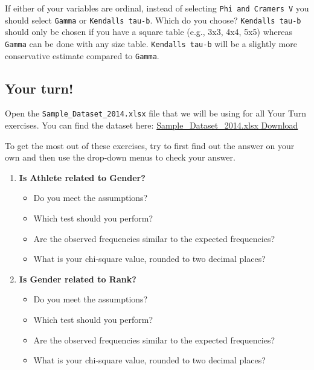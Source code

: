 \documentclass[
]{book}
\begin{document}
If either of your variables are ordinal, instead of selecting \texttt{Phi\ and\ Cramer\textquotesingle{}s\ V} you should select \texttt{Gamma} or \texttt{Kendall\textquotesingle{}s\ tau-b}. Which do you choose? \texttt{Kendall\textquotesingle{}s\ tau-b} should only be chosen if you have a square table (e.g., 3x3, 4x4, 5x5) whereas \texttt{Gamma} can be done with any size table. \texttt{Kendall\textquotesingle{}s\ tau-b} will be a slightly more conservative estimate compared to \texttt{Gamma}.

\hypertarget{your-turn-4}{%
\subsection{Your turn!}\label{your-turn-4}}

Open the \texttt{Sample\_Dataset\_2014.xlsx} file that we will be using for all Your Turn exercises. You can find the dataset here: \href{https://github.com/danawanzer/stats-with-jamovi/blob/master/data/Sample_Dataset_2014.xlsx}{Sample\_Dataset\_2014.xlsx Download}

To get the most out of these exercises, try to first find out the answer on your own and then use the drop-down menus to check your answer.

\begin{enumerate}
\def\labelenumi{\arabic{enumi}.}
\item
  \textbf{Is Athlete related to Gender?}

  \begin{itemize}
  \item
    Do you meet the assumptions?
  \item
    Which test should you perform?
  \item
    Are the observed frequencies similar to the expected frequencies?
  \item
    What is your chi-square value, rounded to two decimal places?
  \end{itemize}
\item
  \textbf{Is Gender related to Rank?}

  \begin{itemize}
  \item
    Do you meet the assumptions?
  \item
    Which test should you perform?
  \item
    Are the observed frequencies similar to the expected frequencies?
  \item
    What is your chi-square value, rounded to two decimal places?
  \end{itemize}
\end{enumerate}
\end{document}
